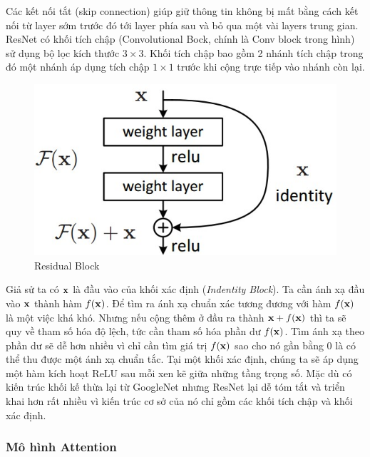 \documentclass[14pt, a4paper]{article}
\numberwithin{equation}{section}
\numberwithin{algorithm}{section}
\numberwithin{figure}{section}
\numberwithin{table}{section}
\numberwithin{dl}{section}
\numberwithin{md}{section}
\numberwithin{bd}{section}
\numberwithin{dn}{section}
\numberwithin{hq}{section}
\begin{document}
    Các kết nối tắt (skip connection) giúp giữ thông tin không bị mất bằng cách kết nối từ layer sớm trước đó tới layer phía sau và bỏ qua một vài layers trung gian.
    ResNet có khối tích chập (Convolutional Bock, chính là Conv block trong hình) sử dụng bộ lọc kích thước $3 \times 3$. 
    Khối tích chập bao gồm 2 nhánh tích chập trong đó một nhánh áp dụng tích chập $1 \times 1$ trước khi cộng trực tiếp vào nhánh còn lại.

    \begin{figure}[h!] \centering

        \includegraphics[scale=0.6]{Residual_Block.jpg}
        \caption{Residual Block}
        \label{fig:Residual_Block}

    \end{figure}

    Giả sử ta có $\bold{x}$ là đầu vào của khối xác định (\textit{Indentity Block}). Ta cần ánh xạ đầu vào $\bold{x}$ thành hàm $f(\bold{x})$. 
    Để tìm ra ánh xạ chuẩn xác tương đương với hàm $f(\bold{x})$ là một việc khá khó. 
    Nhưng nếu cộng thêm ở đầu ra thành $\bold{x} + f(\bold{x})$ thì ta sẽ quy về tham số hóa độ lệch, tức cần tham số hóa phần dư $f(\bold{x})$.
    Tìm ánh xạ theo phần dư sẽ dễ hơn nhiều vì chỉ cần tìm giá trị $f(\bold{x})$ sao cho nó gần bằng 0 là có thể thu được một ánh xạ chuẩn tắc.
    Tại một khối xác định, chúng ta sẽ áp dụng một hàm kích hoạt ReLU sau mỗi xen kẽ giữa những tầng trọng số. 
    Mặc dù có kiến trúc khối kế thừa lại từ GoogleNet nhưng ResNet lại dễ tóm tắt và triển khai hơn rất nhiều vì kiến trúc cơ sở của nó chỉ gồm các khối tích chập và khối xác định.
    
    \subsubsection{Mô hình Attention}
\end{document}
